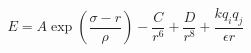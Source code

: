 


$$
E = A \exp \left(\frac{\sigma - r}{\rho} \right) - 
    \frac{C}{r^6} + \frac{D}{r^8} + \frac{kq_i q_j}{\epsilon r}
$$


